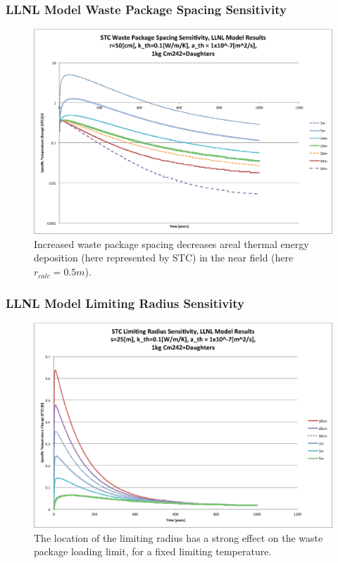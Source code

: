 

\begin{frame}[ctb!]
\frametitle{LLNL Model Waste Package Spacing Sensitivity}
\footnotesize{
\begin{figure}[htbp!]
\begin{center}
\includegraphics[height=0.7\textheight]{./thermal_demonstration/spacing/Cm242spacing_sens.eps}
\end{center}
\caption[$K_{th}$ Sensitivity to $s$]{Increased waste package 
spacing decreases areal thermal energy deposition 
(here represented by STC) in the near field (here $r_{calc} = 0.5m$).}
\label{fig:Cm242spacing_sens}
\end{figure}
}
\end{frame}


\begin{frame}[ctb!]
\frametitle{LLNL Model Limiting Radius Sensitivity}
\footnotesize{
\begin{figure}[htbp!]
\begin{center}
\includegraphics[height=0.7\textheight]{./thermal_demonstration/spacing/Cm242r_lim_sens.eps}
\end{center}
\caption[$K_{th}$ Sensitivity to $r_{lim}$]{
The location of the limiting radius has a strong effect on the 
waste package loading limit, for a fixed limiting temperature.} 
\label{fig:Cm242r_lim_sens}
\end{figure}
}
\end{frame}

